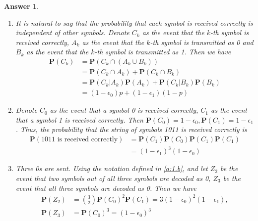 \documentclass[utf8]{article}
\theoremstyle{definition}%
\theoremstyle{plain}%
\newtheorem{answer}{Answer} %
\begin{document}
\begin{answer} ~
\begin{enumerate}[label=(\alph*)]
    \item It is natural to say that the probability that each symbol is received correctly is independent of other symbols. Denote $C_k$ as the event that the $k$-th symbol is received correctly, $A_k$ as the event that the $k$-th symbol is transmitted as 0 and $B_k$ as the event that the $k$-th symbol is transmitted as 1. Then we have
    \begin{equation}
    \begin{aligned}
        \mathbf{P}(C_k) &= \mathbf{P}\left(C_k \cap (A_k \cup B_k)\right) \\
        &= \mathbf{P}(C_k \cap A_k) + \mathbf{P}(C_k \cap B_k) \\
        &= \mathbf{P}(C_k | A_k) \mathbf{P}(A_k) + \mathbf{P}(C_k | B_k) \mathbf{P}(B_k) \\
        &= (1-\epsilon_0)p + (1-\epsilon_1)(1-p)
    \end{aligned}
    \end{equation}
    \item \label{a:1.b} Denote $C_0$ as the event that a symbol 0 is received correctly, $C_1$ as the event that a symbol 1 is received correctly. Then $\mathbf{P}(C_0) = 1-\epsilon_0, \mathbf{P}(C_1) = 1-\epsilon_1$.
    Thus, the probability that the string of symbols 1011 is received correctly is
    \begin{equation}
    \begin{aligned}
        \mathbf{P}(\text{1011 is received correctly}) &= \mathbf{P}(C_1) \mathbf{P}(C_0) \mathbf{P}(C_1) \mathbf{P}(C_1) \\
        &= (1-\epsilon_1)^3(1-\epsilon_0)
    \end{aligned}
    \end{equation}
    \item Three 0s are sent. Using the notation defined in \ref{a:1.b}, and let $Z_2$ be the event that two symbols out of all three symbols are decoded as 0, $Z_3$ be the event that all three symbols are decoded as 0. Then we have
    \begin{equation}
    \begin{aligned}
        \mathbf{P}(Z_2) &= \binom{3}{2}  \mathbf{P}(C_0)^2 \mathbf{P}(C_1) = 3(1-\epsilon_0)^2(1-\epsilon_1), \\
        \mathbf{P}(Z_3) &= \mathbf{P}(C_0)^3 = (1-\epsilon_0)^3
    \end{aligned}

\end{equation}
\end{enumerate}
\end{answer}
\end{document}
